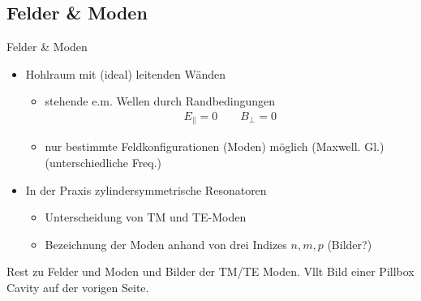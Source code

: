 \documentclass[12pt,xcolor=dvipsnames,professionalfonts]{beamer}
\begin{document}
\subsection{Felder \& Moden}
\begin{frame}{Felder \& Moden}
	\begin{itemize}
		\item Hohlraum mit (ideal) leitenden Wänden
		
		\begin{itemize}
			\item stehende e.m. Wellen durch Randbedingungen
			\begin{align*}
				E_\parallel = 0 \qquad B_\perp = 0
			\end{align*}
			\item nur bestimmte Feldkonfigurationen (Moden) möglich (Maxwell. Gl.) (unterschiedliche Freq.)
		\end{itemize}
		
		\item In der Praxis zylindersymmetrische Resonatoren
		\begin{itemize}
			\item Unterscheidung von TM und TE-Moden
			\item Bezeichnung der Moden anhand von drei Indizes $n, m, p$ (Bilder?)
		\end{itemize}
		
	\end{itemize}
\end{frame}

\begin{frame}
	Rest zu Felder und Moden und Bilder der TM/TE Moden.
	Vllt Bild einer Pillbox Cavity auf der vorigen Seite.
\end{frame}
\end{document}
